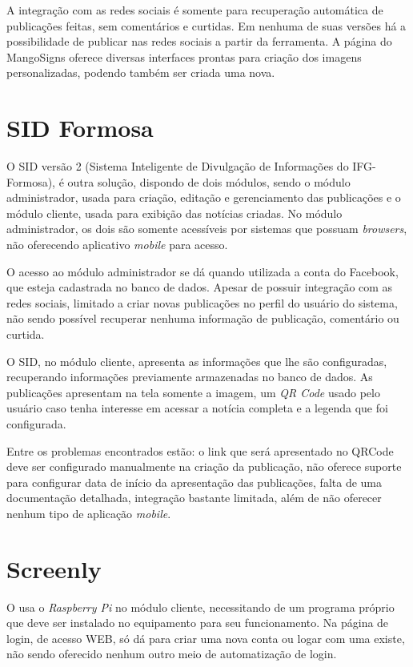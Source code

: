 A integração com as redes sociais é somente para recuperação automática de publicações feitas, sem comentários e curtidas. Em nenhuma de suas versões há a possibilidade de publicar nas redes sociais a partir da ferramenta. A página do MangoSigns oferece diversas interfaces prontas para criação dos imagens personalizadas, podendo também ser criada uma nova. 

\section{SID Formosa}
\label{sec:sid}
O SID versão 2 (Sistema Inteligente de Divulgação de Informações do IFG-Formosa), é outra solução, dispondo de dois módulos, sendo o módulo administrador, usada para criação, editação e gerenciamento das publicações e o módulo cliente, usada para exibição das notícias criadas. No módulo administrador, os dois são somente acessíveis por sistemas que possuam \textit{browsers}, não oferecendo aplicativo \textit{mobile} para acesso.

O acesso ao módulo administrador se dá quando utilizada a conta do Facebook, que esteja cadastrada no banco de dados. Apesar de possuir integração com as redes sociais, limitado a criar novas publicações no perfil do usuário do sistema, não sendo possível recuperar nenhuma informação de publicação, comentário ou curtida.

O SID, no módulo cliente, apresenta as informações que lhe são configuradas, recuperando informações previamente armazenadas no banco de dados. As publicações apresentam na tela somente a imagem, um \textit{QR Code} usado pelo usuário caso tenha interesse em acessar a notícia completa e a legenda que foi configurada. \cite{sobrinho2017}

Entre os problemas encontrados estão: o link que será apresentado no QRCode deve ser configurado manualmente na criação da publicação, não oferece suporte para configurar data de início da apresentação das publicações, falta de uma documentação detalhada, integração bastante limitada, além de não oferecer nenhum tipo de aplicação \textit{mobile}.

\section{Screenly}
O \cite{screenly2017} usa o \textit{Raspberry Pi} no módulo cliente, necessitando de um programa próprio que deve ser instalado no equipamento para seu funcionamento. Na página de login, de acesso WEB, só dá para criar uma nova conta ou logar com uma existe, não sendo oferecido nenhum outro meio de automatização de login. 

